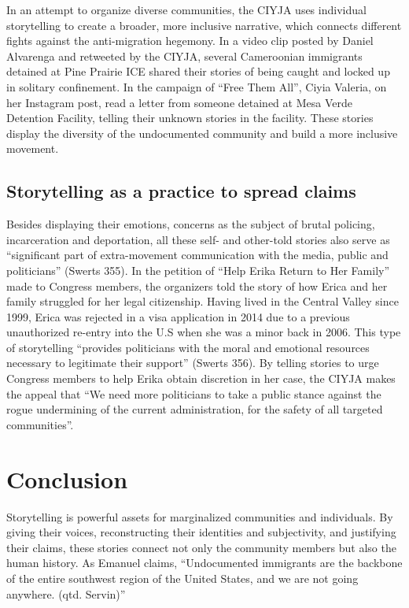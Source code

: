 \documentclass[12pt]{article}
\begin{document}
\begin{flushleft}
In an attempt to organize diverse communities, the CIYJA uses individual storytelling to create a broader, more inclusive narrative, which connects different fights against the anti-migration hegemony.
In a video clip posted by Daniel Alvarenga and retweeted by the CIYJA, several Cameroonian immigrants detained at Pine Prairie ICE shared their stories of being caught and locked up in solitary confinement.
In the campaign of ``Free Them All'', Ciyia Valeria, on her Instagram post, read a letter from someone detained at Mesa Verde Detention Facility, telling their unknown stories in the facility.
These stories display the diversity of the undocumented community and build a more inclusive movement.

\subsection*{Storytelling as a practice to spread claims}

Besides displaying their emotions, concerns as the subject of brutal policing, incarceration and deportation, all these self- and other-told stories also serve as ``significant part of extra-movement communication with the media, public and politicians'' (Swerts 355). %
In the petition of ``Help Erika Return to Her Family'' made to Congress members, the organizers told the story of how Erica and her family struggled for her legal citizenship. %
Having lived in the Central Valley since 1999, Erica was rejected in a visa application in 2014 due to a previous unauthorized re-entry into the U.S when she was a minor back in 2006.
This type of storytelling ``provides politicians with the moral and emotional resources necessary to legitimate their support'' (Swerts 356).
By telling stories to urge Congress members to help Erika obtain discretion in her case, the CIYJA makes the appeal that ``We need more politicians to take a public stance against the rogue undermining of the current administration, for the safety of all targeted communities''. %

\section{Conclusion}

Storytelling is powerful assets for marginalized communities and individuals.
By giving their voices, reconstructing their identities and subjectivity, and justifying their claims, these stories connect not only the community members but also the human history.
As Emanuel claims, ``Undocumented immigrants are the backbone of the entire southwest region of the United States, and we are not going anywhere. (qtd. Servin)'' %


\end{flushleft}
\end{document}
